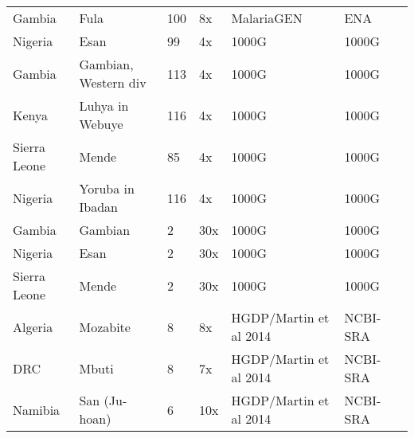 \begin{landscape}
\begin{longtable}{lllllll}
Gambia & Fula & 100 & 8x & MalariaGEN & ENA \\
Nigeria & Esan & 99 & 4x & 1000G & 1000G \\
Gambia & Gambian, Western div & 113 & 4x & 1000G & 1000G \\
Kenya & Luhya in Webuye & 116 & 4x & 1000G & 1000G \\
Sierra Leone & Mende & 85 & 4x & 1000G & 1000G \\
Nigeria & Yoruba in Ibadan & 116 & 4x & 1000G & 1000G \\
Gambia & Gambian & 2 & 30x & 1000G & 1000G \\
Nigeria & Esan & 2 & 30x & 1000G & 1000G \\
Sierra Leone & Mende & 2 & 30x & 1000G & 1000G \\
Algeria & Mozabite & 8 & 8x & HGDP/Martin et al 2014 & NCBI-SRA \\
DRC & Mbuti & 8 & 7x & HGDP/Martin et al 2014 & NCBI-SRA \\
Namibia & San (Ju-hoan) & 6 & 10x & HGDP/Martin et al 2014 & NCBI-SRA \\

\end{longtable}
\end{landscape}
